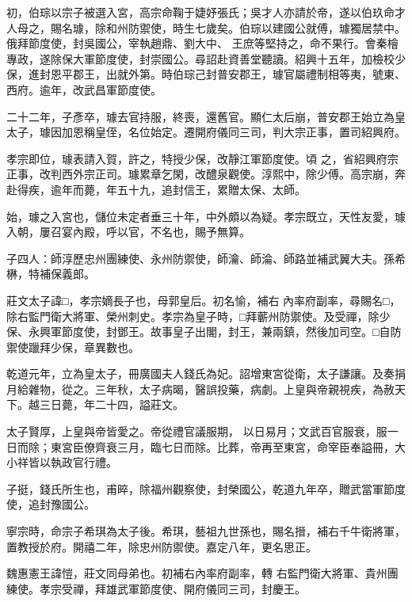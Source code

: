\begin{pinyinscope}
 初，伯琮以宗子被選入宮，高宗命鞠于婕妤張氏；吳才人亦請於帝，遂以伯玖命才人母之，賜名璩，除和州防禦使，時生七歲矣。伯琮以建國公就傅，璩獨居禁中。俄拜節度使，封吳國公，宰執趙鼎、劉大中、
 王庶等堅持之，命不果行。會秦檜專政，遂除保大軍節度使，封崇國公。尋詔赴資善堂聽讀。紹興十五年，加檢校少保，進封恩平郡王，出就外第。時伯琮己封普安郡王，璩官屬禮制相等夷，號東、西府。逾年，改武昌軍節度使。



 二十二年，子彥卒，璩去官持服，終喪，還舊官。顯仁太后崩，普安郡王始立為皇太子，璩因加恩稱皇侄，名位始定。遷開府儀同三司，判大宗正事，置司紹興府。



 孝宗即位，璩表請入賀，許之，特授少保，改靜江軍節度使。頃
 之，省紹興府宗正事，改判西外宗正司。璩累章乞閑，改醴泉觀使。淳熙中，除少傅。高宗崩，奔赴得疾，逾年而薨，年五十九，追封信王，累贈太保、太師。



 始，璩之入宮也，儲位未定者垂三十年，中外頗以為疑。孝宗既立，天性友愛，璩入朝，屢召宴內殿，呼以官，不名也，賜予無算。



 子四人：師淳歷忠州團練使、永州防禦使，師瀹、師淪、師路並補武翼大夫。孫希楙，特補保義郎。



 莊文太子諱□，孝宗嫡長子也，母郭皇后。初名愉，補右
 內率府副率，尋賜名□，除右監門衛大將軍、榮州刺史。孝宗為皇子時，□拜蘄州防禦使。及受禪，除少保、永興軍節度使，封鄧王。故事皇子出閣，封王，兼兩鎮，然後加司空。□自防禦使躐拜少保，章異數也。



 乾道元年，立為皇太子，冊廣國夫人錢氏為妃。詔增東宮從衛，太子謙讓。及奏捐月給雜物，從之。三年秋，太子病暍，醫誤投藥，病劇。上皇與帝親視疾，為赦天下。越三日薨，年二十四，謚莊文。



 太子賢厚，上皇與帝皆愛之。帝從禮官議服期，
 以日易月；文武百官服衰，服一日而除；東宮臣僚齊衰三月，臨七日而除。比葬，帝再至東宮，命宰臣奉謚冊，大小祥皆以執政官行禮。



 子挺，錢氏所生也，甫晬，除福州觀察使，封榮國公，乾道九年卒，贈武當軍節度使，追封豫國公。



 寧宗時，命宗子希琪為太子後。希琪，藝祖九世孫也，賜名搢，補右千牛衛將軍，置教授於府。開禧二年，除忠州防禦使。嘉定八年，更名思正。



 魏惠憲王諱愷，莊文同母弟也。初補右內率府副率，轉
 右監門衛大將軍、貴州團練使。孝宗受禪，拜雄武軍節度使、開府儀同三司，封慶王。




\end{pinyinscope}
